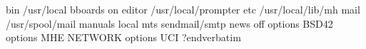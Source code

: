 
\verbatim
bin     /usr/local
bboards on
editor  /usr/local/prompter
etc     /usr/local/lib/mh
mail    /usr/spool/mail
manuals local
mts     sendmail/smtp
news    off
options BSD42
options MHE NETWORK
options UCI
?endverbatim
